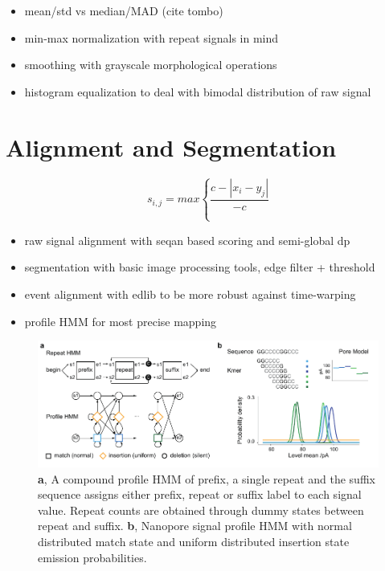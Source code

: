 \begin{itemize}
	\item mean/std vs median/MAD (cite tombo)
	\item min-max normalization with repeat signals in mind
	\item smoothing with grayscale morphological operations
	\item histogram equalization to deal with bimodal distribution of raw signal
\end{itemize}

\section{Alignment and Segmentation}
\label{sec:signal:alignment}

\begin{equation}
    s_{i,j} = max \left\lbrace \frac{c - \left| x_{i} - y_{j} \right| }{-c} \right.
\end{equation}




\begin{itemize}
	\item raw signal alignment with seqan based scoring and semi-global dp
	\item segmentation with basic image processing tools, edge filter + threshold
	\item event alignment with edlib to be more robust against time-warping
	\item profile HMM for most precise mapping
\end{itemize}

\cite{Schreiber2015}

\begin{figure}[h]
	\centering
	\includegraphics[width=1.0\textwidth]{figures/signal/count_hmm.pdf}
	\captionsetup{format=plain}
	\caption[Nanopore signal processing with STRique]{\textbf{a}, A compound profile HMM of prefix, a single repeat and the suffix sequence assigns either prefix, repeat or suffix label to each signal value. Repeat counts are obtained through dummy states between repeat and suffix. \textbf{b}, Nanopore signal profile HMM with normal distributed match state and uniform distributed insertion state emission probabilities.}
	\label{fig:strique:count_hmm}
\end{figure}